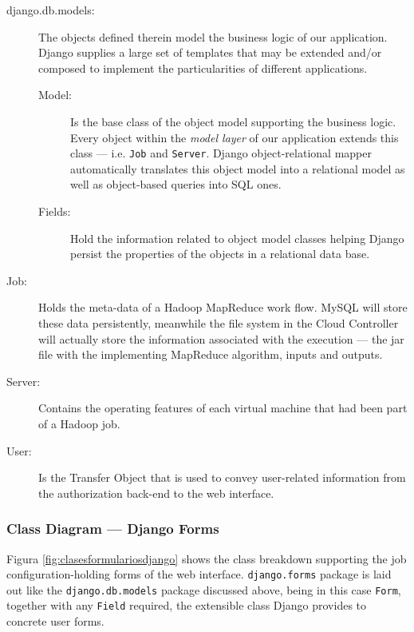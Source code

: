 \begin{description}
 \item[django.db.models:] The objects defined therein model the business logic of our application. Django supplies a large set of templates that may be extended and/or composed to implement the particularities of different applications.
  \begin{description}
   \item[Model:] Is the base class of the object model supporting the business logic. Every object within the \emph{model layer} of our application extends this class --- i.e. \texttt{Job} and \texttt{Server}. Django object-relational mapper automatically translates this object model into a relational model as well as object-based queries into SQL ones.
   \item[Fields:] Hold the information related to object model classes helping Django persist the properties of the objects in a relational data base.
  \end{description}
 \item[Job:] Holds the meta-data of a Hadoop MapReduce work flow. MySQL will store these data persistently, meanwhile the file system in the Cloud Controller will actually store the information associated with the execution --- the jar file with the implementing MapReduce algorithm, inputs and outputs.
 \item[Server:] Contains the operating features of each virtual machine that had been part of a Hadoop job.
 \item[User:] Is the {Transfer Object} that is used to convey user-related information from the authorization back-end to the web interface.
\end{description}

\subsubsection{Class Diagram --- Django Forms}\label{subsubsec:clasesformulariosdjango}
\noindent Figura \ref{fig:clasesformulariosdjango} shows the class breakdown supporting the job configuration-holding forms of the web interface. \texttt{django.forms} package is laid out like the \texttt{django.db.models} package discussed above, being in this case \texttt{Form}, together with any \texttt{Field} required, the extensible class Django provides to concrete user forms.

